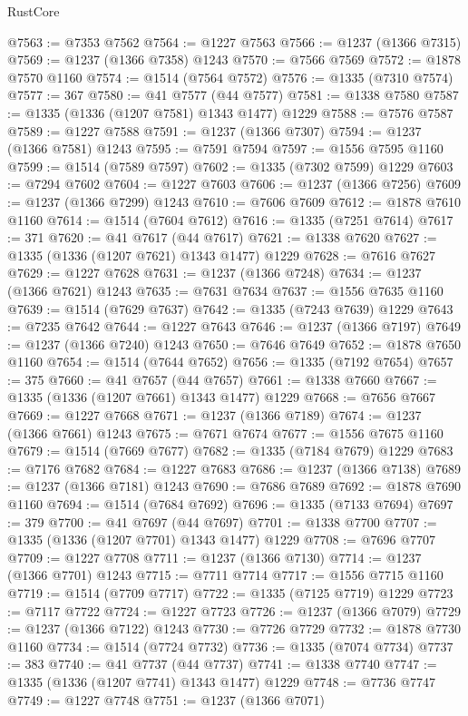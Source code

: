 \begin{lexlean}{RustCore}
\begin{coremodule}
@7563 := @7353 @7562
@7564 := @1227 @7563
@7566 := @1237 (@1366 @7315)
@7569 := @1237 (@1366 @7358) @1243
@7570 := @7566 @7569
@7572 := @1878 @7570 @1160
@7574 := @1514 (@7564 @7572)
@7576 := @1335 (@7310 @7574)
@7577 := 367
@7580 := @41 @7577 (@44 @7577)
@7581 := @1338 @7580
@7587 := @1335 (@1336 (@1207 @7581) @1343 @1477) @1229
@7588 := @7576 @7587
@7589 := @1227 @7588
@7591 := @1237 (@1366 @7307)
@7594 := @1237 (@1366 @7581) @1243
@7595 := @7591 @7594
@7597 := @1556 @7595 @1160
@7599 := @1514 (@7589 @7597)
@7602 := @1335 (@7302 @7599) @1229
@7603 := @7294 @7602
@7604 := @1227 @7603
@7606 := @1237 (@1366 @7256)
@7609 := @1237 (@1366 @7299) @1243
@7610 := @7606 @7609
@7612 := @1878 @7610 @1160
@7614 := @1514 (@7604 @7612)
@7616 := @1335 (@7251 @7614)
@7617 := 371
@7620 := @41 @7617 (@44 @7617)
@7621 := @1338 @7620
@7627 := @1335 (@1336 (@1207 @7621) @1343 @1477) @1229
@7628 := @7616 @7627
@7629 := @1227 @7628
@7631 := @1237 (@1366 @7248)
@7634 := @1237 (@1366 @7621) @1243
@7635 := @7631 @7634
@7637 := @1556 @7635 @1160
@7639 := @1514 (@7629 @7637)
@7642 := @1335 (@7243 @7639) @1229
@7643 := @7235 @7642
@7644 := @1227 @7643
@7646 := @1237 (@1366 @7197)
@7649 := @1237 (@1366 @7240) @1243
@7650 := @7646 @7649
@7652 := @1878 @7650 @1160
@7654 := @1514 (@7644 @7652)
@7656 := @1335 (@7192 @7654)
@7657 := 375
@7660 := @41 @7657 (@44 @7657)
@7661 := @1338 @7660
@7667 := @1335 (@1336 (@1207 @7661) @1343 @1477) @1229
@7668 := @7656 @7667
@7669 := @1227 @7668
@7671 := @1237 (@1366 @7189)
@7674 := @1237 (@1366 @7661) @1243
@7675 := @7671 @7674
@7677 := @1556 @7675 @1160
@7679 := @1514 (@7669 @7677)
@7682 := @1335 (@7184 @7679) @1229
@7683 := @7176 @7682
@7684 := @1227 @7683
@7686 := @1237 (@1366 @7138)
@7689 := @1237 (@1366 @7181) @1243
@7690 := @7686 @7689
@7692 := @1878 @7690 @1160
@7694 := @1514 (@7684 @7692)
@7696 := @1335 (@7133 @7694)
@7697 := 379
@7700 := @41 @7697 (@44 @7697)
@7701 := @1338 @7700
@7707 := @1335 (@1336 (@1207 @7701) @1343 @1477) @1229
@7708 := @7696 @7707
@7709 := @1227 @7708
@7711 := @1237 (@1366 @7130)
@7714 := @1237 (@1366 @7701) @1243
@7715 := @7711 @7714
@7717 := @1556 @7715 @1160
@7719 := @1514 (@7709 @7717)
@7722 := @1335 (@7125 @7719) @1229
@7723 := @7117 @7722
@7724 := @1227 @7723
@7726 := @1237 (@1366 @7079)
@7729 := @1237 (@1366 @7122) @1243
@7730 := @7726 @7729
@7732 := @1878 @7730 @1160
@7734 := @1514 (@7724 @7732)
@7736 := @1335 (@7074 @7734)
@7737 := 383
@7740 := @41 @7737 (@44 @7737)
@7741 := @1338 @7740
@7747 := @1335 (@1336 (@1207 @7741) @1343 @1477) @1229
@7748 := @7736 @7747
@7749 := @1227 @7748
@7751 := @1237 (@1366 @7071)

\end{coremodule}
\end{lexlean}

